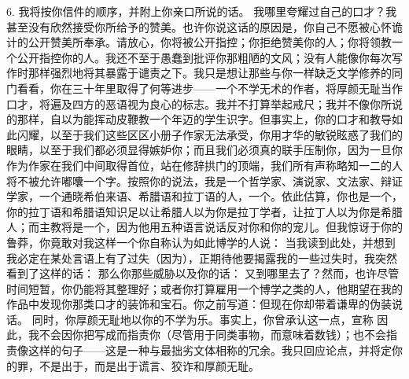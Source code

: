 6. 我将按你信件的顺序，并附上你亲口所说的话。 我哪里夸耀过自己的口才？我甚至没有欣然接受你所给予的赞美。也许你说这话的原因是，你自己不愿被心怀诡计的公开赞美所奉承。请放心，你将被公开指控；你拒绝赞美你的人；你将领教一个公开指控你的人。我还不至于愚蠢到批评你那粗陋的文风；没有人能像你每次写作时那样强烈地将其暴露于谴责之下。我只是想让那些与你一样缺乏文学修养的同门看看，你在三十年里取得了何等进步——一个不学无术的作者，将厚颜无耻当作口才，将遍及四方的恶语视为良心的标志。我并不打算举起戒尺；我并不像你所说的那样，自以为能挥动皮鞭教一个年迈的学生识字。但事实上，你的口才和教导如此闪耀，以至于我们这些区区小册子作家无法承受，你用才华的敏锐眩惑了我们的眼睛，以至于我们都必须显得嫉妒你；而且我们必须真的联手压制你，因为一旦你作为作家在我们中间取得首位，站在修辞拱门的顶端，我们所有声称略知一二的人将不被允许嘟囔一个字。按照你的说法，我是一个哲学家、演说家、文法家、辩证学家，一个通晓希伯来语、希腊语和拉丁语的人，一个。依此估算，你也是一个，你的拉丁语和希腊语知识足以让希腊人以为你是拉丁学者，让拉丁人以为你是希腊人；而主教将是一个，因为他用五种语言说话反对你和你的宠儿。但我惊讶于你的鲁莽，你竟敢对我这样一个你自称认为如此博学的人说： 当我读到此处，并想到我必定在某处言语上有了过失（因为），正期待他要揭露我的一些过失时，我突然看到了这样的话： 那么你那些威胁以及你的话： 又到哪里去了？然而，也许尽管时间短暂，你仍能将其整理好；或者你打算雇用一个博学之类的人，他期望在我的作品中发现你那类口才的装饰和宝石。你之前写道：但现在你却带着谦卑的伪装说话。 同时，你厚颜无耻地以你的不学为乐。事实上，你曾承认这一点，宣称 因此，我不会因你把写成而指责你（尽管用于同类事物，而意味着数钱）；也不会指责像这样的句子——这是一种与最拙劣文体相称的冗余。我只回应论点，并将定你的罪，不是出于，而是出于谎言、狡诈和厚颜无耻。\par

